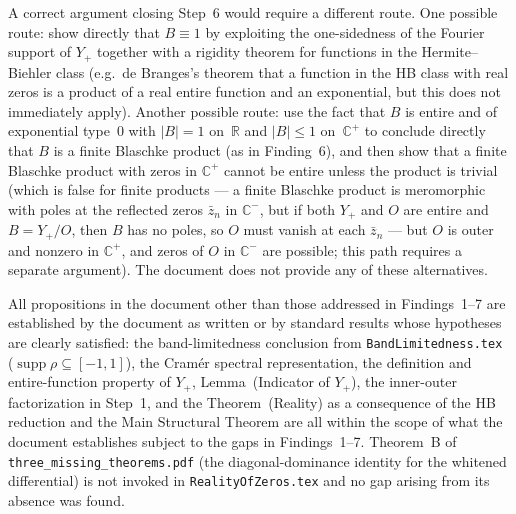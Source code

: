 \documentclass[11pt]{article}
\newcommand{\R}{\mathbb{R}}
\newcommand{\C}{\mathbb{C}}
\begin{document}
\begin{description}[leftmargin=0pt]
\item[What would establish it:]
A correct argument closing Step~6 would require a different route.
One possible route: show directly that $B\equiv 1$ by exploiting the one-sidedness
of the Fourier support of $Y_+$ together with a rigidity theorem for functions in
the Hermite--Biehler class (e.g.\ de Branges's theorem that a function in the HB
class with real zeros is a product of a real entire function and an exponential,
but this does not immediately apply).
Another possible route: use the fact that $B$ is entire and of exponential type~$0$
with $|B|=1$ on~$\R$ and $|B|\le 1$ on~$\C^+$ to conclude directly that $B$ is a
finite Blaschke product (as in Finding~6), and then show that a finite Blaschke
product with zeros in $\C^+$ cannot be entire unless the product is trivial
(which is false for finite products --- a finite Blaschke product is meromorphic
with poles at the reflected zeros $\bar z_n$ in $\C^-$, but if both $Y_+$ and $O$
are entire and $B=Y_+/O$, then $B$ has no poles, so $O$ must vanish at each
$\bar z_n$ --- but $O$ is outer and nonzero in $\C^+$, and zeros of $O$ in $\C^-$
are possible; this path requires a separate argument).
The document does not provide any of these alternatives.
\end{description}

\bigskip
\noindent
All propositions in the document other than those addressed in Findings~1--7 are
established by the document as written or by standard results whose hypotheses are
clearly satisfied:
the band-limitedness conclusion from \texttt{BandLimitedness.tex}
($\operatorname{supp}\rho\subseteq[-1,1]$),
the Cram\'{e}r spectral representation, the definition and entire-function property
of $Y_+$, Lemma~(Indicator of $Y_+$), the inner-outer factorization in Step~1,
and the Theorem~(Reality) as a consequence of the HB reduction and the Main
Structural Theorem are all within the scope of what the document establishes
subject to the gaps in Findings~1--7.
Theorem~B of \texttt{three\_missing\_theorems.pdf} (the diagonal-dominance identity
for the whitened differential) is not invoked in \texttt{RealityOfZeros.tex} and
no gap arising from its absence was found.
\end{document}
